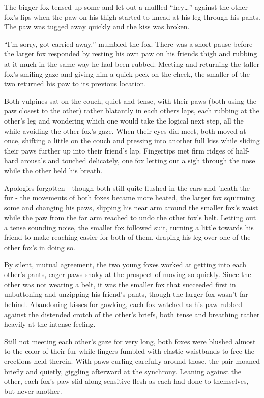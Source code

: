 The bigger fox tensed up some and let out a muffled ``hey\ldots{}'' against the other fox's lips when the paw on his thigh started to knead at his leg through his pants. The paw was tugged away quickly and the kiss was broken.

``I'm sorry, got carried away,'' mumbled the fox. There was a short pause before the larger fox responded by resting his own paw on his friends thigh and rubbing at it much in the same way he had been rubbed. Meeting and returning the taller fox's smiling gaze and giving him a quick peck on the cheek, the smaller of the two returned his paw to its previous location.

Both vulpines sat on the couch, quiet and tense, with their paws (both using the paw closest to the other) rather blatantly in each others laps, each rubbing at the other's leg and wondering which one would take the logical next step, all the while avoiding the other fox's gaze. When their eyes did meet, both moved at once, shifting a little on the couch and pressing into another full kiss while sliding their paws further up into their friend's lap. Fingertips met firm ridges of half-hard arousals and touched delicately, one fox letting out a sigh through the nose while the other held his breath.

Apologies forgotten - though both still quite flushed in the ears and 'neath the fur - the movements of both foxes became more heated, the larger fox squirming some and changing his paws, slipping his near arm around the smaller fox's waist while the paw from the far arm reached to undo the other fox's belt. Letting out a tense sounding noise, the smaller fox followed suit, turning a little towards his friend to make reaching easier for both of them, draping his leg over one of the other fox's in doing so.

By silent, mutual agreement, the two young foxes worked at getting into each other's pants, eager paws shaky at the prospect of moving so quickly. Since the other was not wearing a belt, it was the smaller fox that succeeded first in unbuttoning and unzipping his friend's pants, though the larger fox wasn't far behind. Abandoning kisses for gawking, each fox watched as his paw rubbed against the distended crotch of the other's briefs, both tense and breathing rather heavily at the intense feeling.

Still not meeting each other's gaze for very long, both foxes were blushed almost to the color of their fur while fingers fumbled with elastic waistbands to free the erections held therein. With paws curling carefully around those, the pair moaned briefly and quietly, giggling afterward at the synchrony. Leaning against the other, each fox's paw slid along sensitive flesh as each had done to themselves, but never another.

